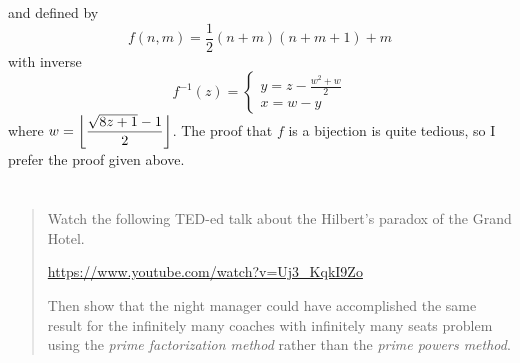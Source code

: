 \documentclass{article}
\begin{document}
and defined by
\[f(n, m) = \frac{1}{2}(n + m)(n + m + 1) + m\]
with inverse
\[f^{-1}(z) = \begin{cases}y = z - \frac{w^2 + w}{2}\\ x = w - y\end{cases}\]
where $\displaystyle w = \floor*{\frac{\sqrt{8z + 1} - 1}{2}}$. The proof that $f$ is a bijection
is quite tedious, so I prefer the proof given above.

\section{}
\begin{quote}
    Watch the following TED-ed talk about the Hilbert's paradox of the Grand
    Hotel.
    \begin{center}
        \url{https://www.youtube.com/watch?v=Uj3_KqkI9Zo}
    \end{center}
    Then show that the night manager could have accomplished the same result
    for the infinitely many coaches with infinitely many seats problem using
    the \textit{prime factorization method} rather than the \textit{prime
        powers method}.
\end{quote}

\end{document}
